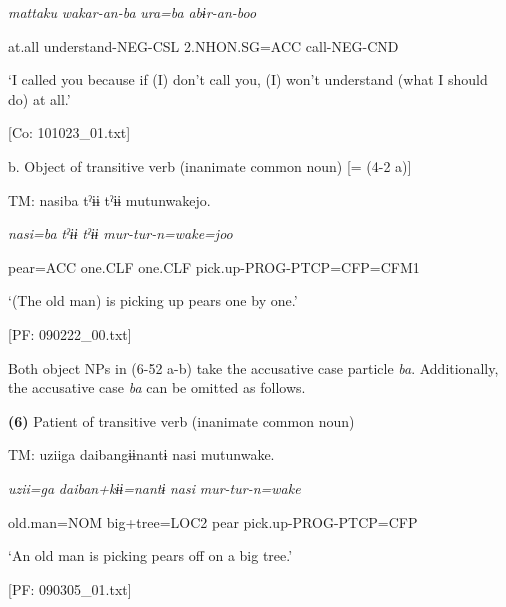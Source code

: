       \textit{mattaku}  \textit{wakar-an-ba}  \textit{ura=ba}  \textit{abɨr-an-boo}

      at.all  understand-NEG-CSL  2.NHON.SG=ACC  call-NEG-CND

      ‘I called you because if (I) don’t call you, (I) won’t understand (what I should do) at all.’

      [Co: 101023\_01.txt]

  b.  Object of transitive verb (inanimate common noun) [= (4-2 a)]

    TM:  nasiba  tˀɨɨ  tˀɨɨ  mutunwakejo.

      \textit{nasi=ba}  \textit{tˀɨɨ}  \textit{tˀɨɨ}  \textit{mur-tur-n=wake=joo}

      pear=ACC  one.CLF  one.CLF  pick.up-PROG-PTCP=CFP=CFM1

      ‘(The old man) is picking up pears one by one.’

      [PF: 090222\_00.txt]

Both object NPs in (6-52 a-b) take the accusative case particle \textit{ba}. Additionally, the accusative case \textit{ba} can be omitted as follows.

\textbf{(6)}  Patient of transitive verb (inanimate common noun)

  TM:  uziiga  daibangɨɨnantɨ  nasi  mutunwake.

    \textit{uzii=ga}  \textit{daiban+kɨɨ=nantɨ}  \textit{nasi}  \textit{mur-tur-n=wake}

    old.man=NOM  big+tree=LOC2  pear  pick.up-PROG-PTCP=CFP

    ‘An old man is picking pears off on a big tree.’

    [PF: 090305\_01.txt]

